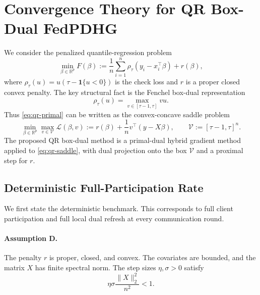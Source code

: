 \section{Convergence Theory for QR Box-Dual FedPDHG}
\label{sec:convergence-theory}

We consider the penalized quantile-regression problem
\begin{equation}
    \min_{\beta \in \mathbb{R}^p}
    F(\beta)
    :=
    \frac{1}{n}\sum_{i=1}^n
    \rho_\tau(y_i - x_i^\top \beta)
    + r(\beta),
    \label{eq:qr-primal}
\end{equation}
where $\rho_\tau(u)=u(\tau-\mathbf{1}\{u<0\})$ is the check loss and
$r$ is a proper closed convex penalty. The key structural fact is the
Fenchel box-dual representation
\begin{equation}
    \rho_\tau(u)
    =
    \max_{v \in [\tau-1,\tau]} vu .
\end{equation}
Thus \eqref{eq:qr-primal} can be written as the convex-concave saddle problem
\begin{equation}
    \min_{\beta \in \mathbb{R}^p}
    \max_{v \in \mathcal{V}}
    \mathcal{L}(\beta,v)
    :=
    r(\beta)
    +
    \frac{1}{n}v^\top (y-X\beta),
    \qquad
    \mathcal{V}:=[\tau-1,\tau]^n .
    \label{eq:qr-saddle}
\end{equation}
The proposed QR box-dual method is a primal-dual hybrid gradient method applied
to \eqref{eq:qr-saddle}, with dual projection onto the box $\mathcal{V}$ and a
proximal step for $r$.

\subsection{Deterministic Full-Participation Rate}

We first state the deterministic benchmark. This corresponds to full client
participation and full local dual refresh at every communication round.

\paragraph{Assumption D.}
The penalty $r$ is proper, closed, and convex. The covariates are bounded, and
the matrix $X$ has finite spectral norm. The step sizes $\eta,\sigma>0$ satisfy
\begin{equation}
    \eta\sigma \frac{\|X\|_2^2}{n^2} < 1 .
    \label{eq:pdhg-stepsize}
\end{equation}

